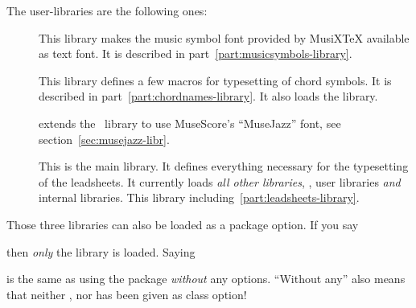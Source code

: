 \documentclass[load-preamble+]{cnltx-doc}
\def\library*#1{``#1''}%
\begin{document}
The user-libraries are the following ones:
\begin{description}
  \item[] This library makes
    the music symbol font provided by MusiX\TeX{} available as text font.  It
    is described in part~\ref{part:musicsymbols-library}.
  \item[] This library defines a
    few macros for typesetting of chord symbols.  It is described in
    part~\ref{part:chordnames-library}.  It also loads the
    library.
  \item[] extends the \chordnames\ library to use
    MuseScore's \enquote{MuseJazz} font, see section~\ref{sec:musejazz-libr}.
  \item[]  This is the main library.  It
    defines everything necessary for the typesetting of the leadsheets.  It
    currently loads \emph{all other libraries}, \ie, user libraries \emph{and}
    internal libraries.  This library including~\ref{part:leadsheets-library}.
\end{description}
Those three libraries can also be loaded as a package option.  If you say
\begin{sourcecode}
  \usepackage[musicsymbols]{leadsheets}
\end{sourcecode}
then \emph{only} the  library is loaded.  Saying
\begin{sourcecode}
  \usepackage[songs]{leadsheets}
\end{sourcecode}
is the same as using the package \emph{without} any options.  ``Without any''
also means that neither ,  nor
 has been given as class option!
\end{document}
